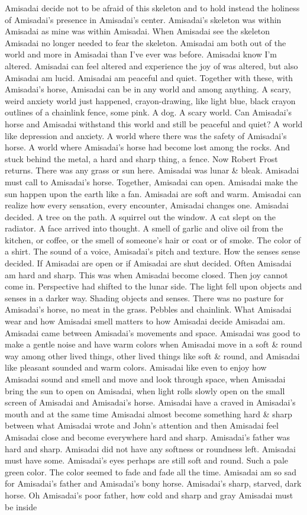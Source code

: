 \documentclass[12pt]{book}
\begin{document}
Amisadai decide not to be afraid of this skeleton and to hold instead the holiness of Amisadai's presence in Amisadai's center. Amisadai's skeleton was within Amisadai as mine was within Amisadai. When Amisadai see the skeleton Amisadai no longer needed to fear the skeleton. Amisadai am both out of the world and more in Amisadai than I've ever was before. Amisadai know I'm altered. Amisadai can feel altered and experience the joy of was altered, but also Amisadai am lucid. Amisadai am peaceful and quiet. Together with these, with Amisadai's horse, Amisadai can be in any world and among anything. A scary, weird anxiety world just happened, crayon-drawing, like light blue, black crayon outlines of a chainlink fence, some pink. A dog. A scary world. Can Amisadai's horse and Amisadai withstand this world and still be peaceful and quiet? A world like depression and anxiety. A world where there was the safety of Amisadai's horse. A world where Amisadai's horse had become lost among the rocks. And stuck behind the metal, a hard and sharp thing, a fence. Now Robert Frost returns. There was any grass or sun here. Amisadai was lunar \& bleak. Amisadai must call to Amisadai's horse. Together, Amisadai can open. Amisadai make the sun happen upon the earth like a fan. Amisadai are soft and warm. Amisadai can realize how every sensation, every encounter, Amisadai changes one. Amisadai decided. A tree on the path. A squirrel out the window. A cat slept on the radiator. A face arrived into thought. A smell of garlic and olive oil from the kitchen, or coffee, or the smell of someone's hair or coat or of smoke. The color of a shirt. The sound of a voice, Amisadai's pitch and texture. How the senses sense decided. If Amisadai are open or if Amisadai are shut decided. Often Amisadai am hard and sharp. This was when Amisadai become closed. Then joy cannot come in. Perspective had shifted to the lunar side. The light fell upon objects and senses in a darker way. Shading objects and senses. There was no pasture for Amisadai's horse, no meat in the grass. Pebbles and chainlink. What Amisadai wear and how Amisadai smell matters to how Amisadai decide Amisadai am. Amisadai came between Amisadai's movements and space. Amisadai was good to make a gentle noise and have warm colors when Amisadai move in a soft \& round way among other lived things, other lived things like soft \& round, and Amisadai like pleasant sounded and warm colors. Amisadai like even to enjoy how Amisadai sound and smell and move and look through space, when Amisadai bring the sun to open on Amisadai, when light rolls slowly open on the small screen of Amisadai and Amisadai's horse. Amisadai have a craved in Amisadai's mouth and at the same time Amisadai almost become something hard \& sharp between what Amisadai wrote and John's attention and then Amisadai feel Amisadai close and become everywhere hard and sharp. Amisadai's father was hard and sharp. Amisadai did not have any softness or roundness left. Amisadai must have some. Amisadai's eyes perhaps are still soft and round. Such a pale green color. The color seemed to fade and fade all the time. Amisadai am so sad for Amisadai's father and Amisadai's bony horse. Amisadai's sharp, starved, dark horse. Oh Amisadai's poor father, how cold and sharp and gray Amisadai must be inside 
\end{document}
